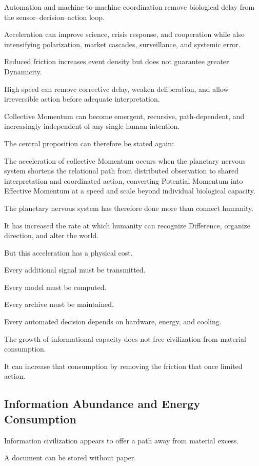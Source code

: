 Automation and machine-to-machine coordination remove biological delay from the sensor–decision–action loop.

Acceleration can improve science, crisis response, and cooperation while also intensifying polarization, market cascades, surveillance, and systemic error.

Reduced friction increases event density but does not guarantee greater Dynamicity.

High speed can remove corrective delay, weaken deliberation, and allow irreversible action before adequate interpretation.

Collective Momentum can become emergent, recursive, path-dependent, and increasingly independent of any single human intention.

The central proposition can therefore be stated again:

The acceleration of collective Momentum occurs when the planetary nervous system shortens the relational path from distributed observation to shared interpretation and coordinated action, converting Potential Momentum into Effective Momentum at a speed and scale beyond individual biological capacity.

The planetary nervous system has therefore done more than connect humanity.

It has increased the rate at which humanity can recognize Difference, organize direction, and alter the world.

But this acceleration has a physical cost.

Every additional signal must be transmitted.

Every model must be computed.

Every archive must be maintained.

Every automated decision depends on hardware, energy, and cooling.

The growth of informational capacity does not free civilization from material consumption.

It can increase that consumption by removing the friction that once limited action.

\subsection*{\textbf{ Information Abundance and Energy Consumption}} 

Information civilization appears to offer a path away from material excess.

A document can be stored without paper.

